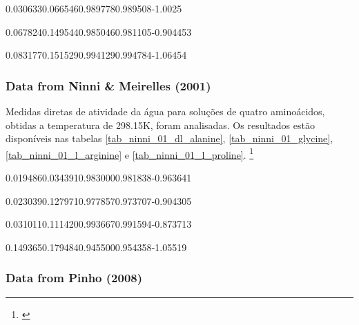 %
	{0.030633}{0.066546}{0.989778}{0.989508}{-1.0025}

%
	{0.067824}{0.149544}{0.985046}{0.981105}{-0.904453}

%
	{0.083177}{0.151529}{0.994129}{0.994784}{-1.06454}

\FloatBarrier

\subsubsection{Data from Ninni \& Meirelles (2001)}

Medidas diretas de atividade da água para soluções de quatro aminoácidos,
obtidas a temperatura de 298.15K, foram analisadas. Os resultados estão disponíveis
nas tabelas \ref{tab_ninni_01_dl_alanine}, \ref{tab_ninni_01_glycine},
\ref{tab_ninni_01_l_arginine} e \ref{tab_ninni_01_l_proline}.
\footnote{\cite{ninni2001}}


%
	{0.019486}{0.034391}{0.983000}{0.981838}{-0.963641}

%
	{0.023039}{0.127971}{0.977857}{0.973707}{-0.904305}

%
	{0.031011}{0.111420}{0.993667}{0.991594}{-0.873713}

%
	{0.149365}{0.179484}{0.945500}{0.954358}{-1.05519}

\FloatBarrier

\subsubsection{Data from Pinho (2008)}


